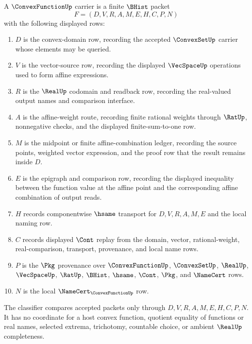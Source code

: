\begin{definition}
\label{def:convex-function-carrier}
A $\ConvexFunctionUp$ carrier is a finite $\BHist$ packet
$$
F=(D,V,R,A,M,E,H,C,P,N)
$$
with the following displayed rows:
\begin{enumerate}
\item $D$ is the convex-domain row, recording the accepted $\ConvexSetUp$ carrier whose elements may be queried.
\item $V$ is the vector-source row, recording the displayed $\VecSpaceUp$ operations used to form affine expressions.
\item $R$ is the $\RealUp$ codomain and readback row, recording the real-valued output names and comparison interface.
\item $A$ is the affine-weight route, recording finite rational weights through $\RatUp$, nonnegative checks, and the displayed finite-sum-to-one row.
\item $M$ is the midpoint or finite affine-combination ledger, recording the source points, weighted vector expression, and the proof row that the result remains inside $D$.
\item $E$ is the epigraph and comparison row, recording the displayed inequality between the function value at the affine point and the corresponding affine combination of output reads.
\item $H$ records componentwise $\hsame$ transport for $D,V,R,A,M,E$ and the local naming row.
\item $C$ records displayed $\Cont$ replay from the domain, vector, rational-weight, real-comparison, transport, provenance, and local name rows.
\item $P$ is the $\Pkg$ provenance over $\ConvexFunctionUp$, $\ConvexSetUp$, $\RealUp$, $\VecSpaceUp$, $\RatUp$, $\BHist$, $\hsame$, $\Cont$, $\Pkg$, and $\NameCert$ rows.
\item $N$ is the local $\NameCert_{\ConvexFunctionUp}$ row.
\end{enumerate}
The classifier compares accepted packets only through $D,V,R,A,M,E,H,C,P,N$. It has no coordinate for a host convex function, quotient equality of functions or real names, selected extrema, trichotomy, countable choice, or ambient $\RealUp$ completeness.
\end{definition}

